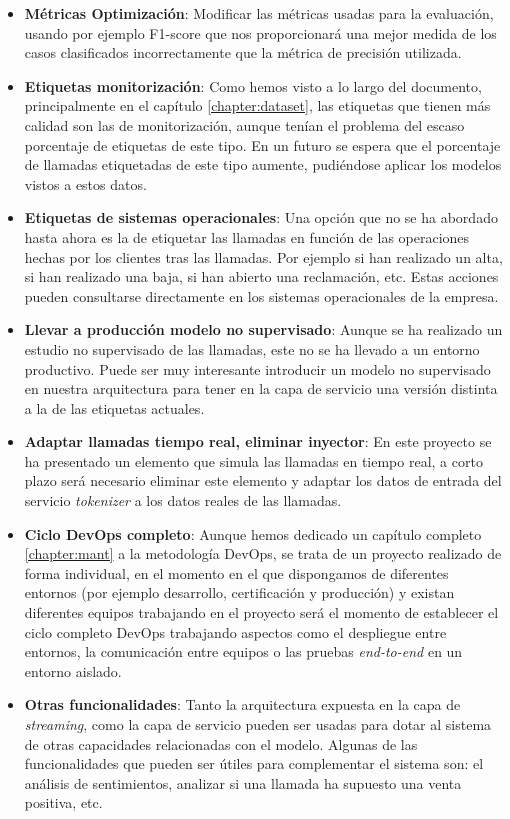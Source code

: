 \begin{itemize}
	\item \textbf{Métricas Optimización}: Modificar las métricas usadas para la evaluación, usando por ejemplo F1-score que nos proporcionará una mejor medida de los casos clasificados incorrectamente que la métrica de precisión utilizada.
	\item \textbf{Etiquetas monitorización}: Como hemos visto a lo largo del documento, principalmente en el capítulo \ref{chapter:dataset}, las etiquetas que tienen más calidad son las de monitorización, aunque tenían el problema del escaso porcentaje de etiquetas de este tipo. En un futuro se espera que el porcentaje de llamadas etiquetadas de este tipo aumente, pudiéndose aplicar los modelos vistos a estos datos.
	\item \textbf{Etiquetas de sistemas operacionales}: Una  opción que no se ha abordado hasta ahora es la de etiquetar las llamadas en función de las operaciones hechas por los clientes tras las llamadas. Por ejemplo si han realizado un alta, si han realizado una baja, si han abierto una reclamación, etc. Estas acciones pueden consultarse directamente en los sistemas operacionales de la empresa.
	\item \textbf{Llevar a producción modelo no supervisado}: Aunque se ha realizado un estudio no supervisado de las llamadas, este no se ha llevado a un entorno productivo. Puede ser muy interesante introducir un modelo no supervisado en nuestra arquitectura para tener en la capa de servicio una versión distinta a la de las etiquetas actuales. 
	\item \textbf{Adaptar llamadas tiempo real, eliminar inyector}: En este proyecto se ha presentado un elemento que simula las llamadas en tiempo real, a corto plazo será necesario eliminar este elemento y adaptar los datos de entrada del servicio \textit{tokenizer} a los datos reales de las llamadas. 
	
	\item \textbf{Ciclo DevOps completo}: Aunque hemos dedicado un capítulo completo \ref{chapter:mant} a la metodología DevOps, se trata de un proyecto realizado de forma individual, en el momento en el que dispongamos de diferentes entornos (por ejemplo desarrollo, certificación y producción) y existan diferentes equipos trabajando en el proyecto será el momento de establecer el ciclo completo DevOps trabajando aspectos como el despliegue entre entornos, la comunicación entre equipos o las pruebas \textit{end-to-end} en un entorno aislado.
	
	
	\item \textbf{Otras funcionalidades}: Tanto la arquitectura expuesta en la capa de \textit{streaming}, como la capa de servicio pueden ser usadas para dotar al sistema de otras capacidades relacionadas con el modelo. Algunas de las funcionalidades que pueden ser útiles para complementar el sistema son: el análisis de sentimientos, analizar si una llamada ha supuesto una venta positiva, etc. 


\end{itemize}

